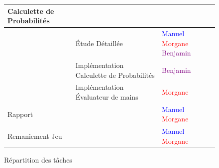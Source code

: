 \documentclass{report}
\begin{document}
\begin{figure}[h]
\begin{tabular}{|l|l|l|}
  				 \hline
  				 Calculette de Probabilités & & \\
  				 \hline
  				 & Étude Détaillée & \textcolor{blue}{Manuel}  \textcolor{red}{Morgane} \textcolor{purple}{Benjamin}\\
  				 \hline
  				 & Implémentation Calculette de Probabilités & \textcolor{purple}{Benjamin}\\
  				 \hline
  				 & Implémentation Évaluateur de mains & \textcolor{red}{Morgane} \\
  				 \hline
  				 Rapport & & \textcolor{blue}{Manuel}  \textcolor{red}{Morgane} \\
  				 \hline
  				 Remaniement Jeu & & \textcolor{blue}{Manuel}  \textcolor{red}{Morgane} \\
   				\hline
			\end{tabular}	
			\caption{Répartition des tâches}
		\end{figure}
		\medskip
\end{document}

